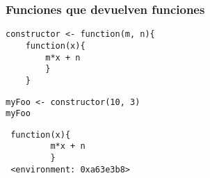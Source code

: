 \documentclass[xcolor={usenames,svgnames,dvipsnames}]{beamer}
\begin{document}
\begin{frame}[fragile]
\frametitle{Funciones que devuelven funciones}
\label{sec-2-5}


\lstset{language=R}
\begin{lstlisting}
constructor <- function(m, n){
    function(x){
        m*x + n
        }
    }
\end{lstlisting}



\lstset{language=R}
\begin{lstlisting}
myFoo <- constructor(10, 3)
myFoo
\end{lstlisting}

\begin{verbatim}
 function(x){
         m*x + n
         }
 <environment: 0xa63e3b8>
\end{verbatim}
\end{frame}
\end{document}
